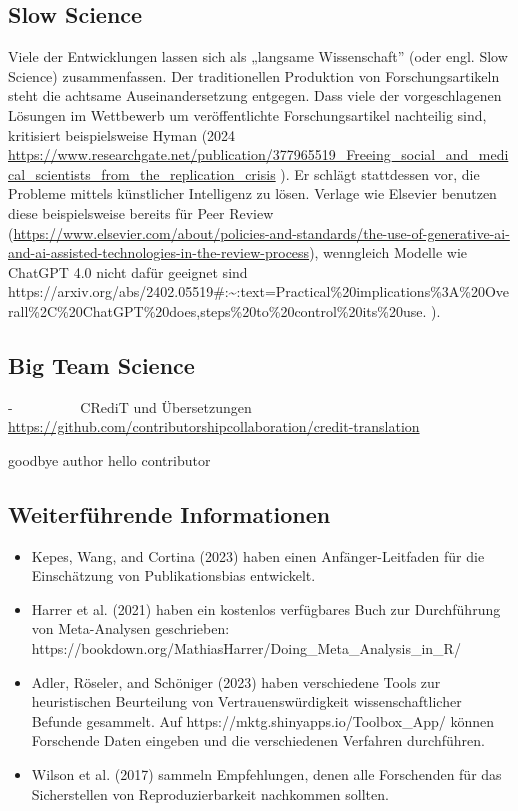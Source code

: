\documentclass[
  letterpaper,
  DIV=11,
  numbers=noendperiod]{scrreprt}
\begin{document}
\subsection{Slow Science}\label{slow-science}

Viele der Entwicklungen lassen sich als „langsame Wissenschaft'' (oder
engl. Slow Science) zusammenfassen. Der traditionellen Produktion von
Forschungsartikeln steht die achtsame Auseinandersetzung entgegen. Dass
viele der vorgeschlagenen Lösungen im Wettbewerb um veröffentlichte
Forschungsartikel nachteilig sind, kritisiert beispielsweise Hyman (2024
\url{https://www.researchgate.net/publication/377965519_Freeing_social_and_medical_scientists_from_the_replication_crisis}
). Er schlägt stattdessen vor, die Probleme mittels künstlicher
Intelligenz zu lösen. Verlage wie Elsevier benutzen diese beispielsweise
bereits für Peer Review
(\hyperref[0]{https://www.elsevier.com/about/policies-and-standards/the-use-of-generative-ai-and-ai-assisted-technologies-in-the-review-process}),
wenngleich Modelle wie ChatGPT 4.0 nicht dafür geeignet sind
https://arxiv.org/abs/2402.05519\#:\textasciitilde:text=Practical\%20implications\%3A\%20Overall\%2C\%20ChatGPT\%20does,steps\%20to\%20control\%20its\%20use.
).

\subsection{Big Team Science}\label{big-team-science}

-~~~~~~~~~ CRediT und Übersetzungen
\url{https://github.com/contributorshipcollaboration/credit-translation}

goodbye author hello contributor

\subsection{Weiterführende
Informationen}\label{weiterfuxfchrende-informationen-4}

\begin{itemize}
\item
  Kepes, Wang, and Cortina (2023) haben einen Anfänger-Leitfaden für die
  Einschätzung von Publikationsbias entwickelt.
\item
  Harrer et al. (2021) haben ein kostenlos verfügbares Buch zur
  Durchführung von Meta-Analysen geschrieben:
  https://bookdown.org/MathiasHarrer/Doing\_Meta\_Analysis\_in\_R/
\item
  Adler, Röseler, and Schöniger (2023) haben verschiedene Tools zur
  heuristischen Beurteilung von Vertrauenswürdigkeit wissenschaftlicher
  Befunde gesammelt. Auf https://mktg.shinyapps.io/Toolbox\_App/ können
  Forschende Daten eingeben und die verschiedenen Verfahren durchführen.
\item
  Wilson et al. (2017) sammeln Empfehlungen, denen alle Forschenden für
  das Sicherstellen von Reproduzierbarkeit nachkommen sollten.
\end{itemize}
\end{document}
